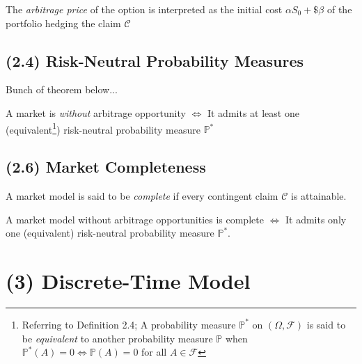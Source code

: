 \documentclass[12pt]{extarticle}
\newcommand{\<}{\langle}
\renewcommand{\>}{\rangle}
\theoremstyle{definition}
\begin{document}
\begin{tcolorbox}[enhanced, drop fuzzy shadow, title=Definition 0.3: Pricing and hedging in a binary model]
The \textit{arbitrage price} of the option is interpreted as the initial cost $\alpha S_0 + \$\beta$ of the portfolio hedging the claim $\mathcal{C}$
\end{tcolorbox}

\newpage
\subsection{(2.4) Risk-Neutral Probability Measures}
Bunch of theorem below...
\begin{tcolorbox}[enhanced, drop fuzzy shadow, title=Theorem 2.5]
A market is \textit{without} arbitrage opportunity $\iff$ It admits at least one (equivalent\footnote{Referring to Definition 2.4; A probability measure $\mathbb{P}^*$ on $(\Omega, \mathcal{F})$ is said to be \textit{equivalent} to another probability measure $\mathbb{P}$ when $\mathbb{P}^*(A)=0 \iff \mathbb{P}(A)=0$ for all $A \in \mathcal{F}$}) risk-neutral probability measure $\mathbb{P}^*$
\end{tcolorbox}

\subsection{(2.6) Market Completeness}
\begin{tcolorbox}[enhanced, drop fuzzy shadow, title=Definition 2.10: Pricing and hedging in a binary model]
A market model is said to be \textit{complete} if every contingent claim $\mathcal{C}$ is attainable.
\end{tcolorbox}

\begin{tcolorbox}[enhanced, drop fuzzy shadow, title=Definition 2.11: Pricing and hedging in a binary model]
A market model without arbitrage opportunities is complete $\iff$ It admits only one (equivalent) risk-neutral probability measure $\mathbb{P}^*$.
\end{tcolorbox}

\newpage
\section{(3) Discrete-Time Model}
\end{document}
